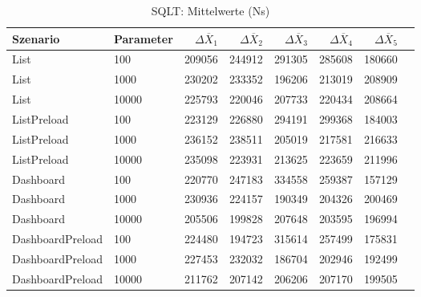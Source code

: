 
\begin{table}[ht]
\setlength{\extrarowheight}{-1pt}
\centering
\caption{SQLT: Mittelwerte (Ns)}
\begin{tabular}{llrrrrrr}
\toprule
Szenario & Parameter & ${\Delta \overline{X}_1}$ & ${\Delta \overline{X}_2}$ & ${\Delta \overline{X}_3}$ & ${\Delta \overline{X}_4}$ & ${\Delta \overline{X}_5}$ \\
\midrule
	List & 100 & 209056 & 244912 & 291305 & 285608 & 180660 \\
	List & 1000 & 230202 & 233352 & 196206 & 213019 & 208909 \\
	List & 10000 & 225793 & 220046 & 207733 & 220434 & 208664 \\
	ListPreload & 100 & 223129 & 226880 & 294191 & 299368 & 184003 \\
	ListPreload & 1000 & 236152 & 238511 & 205019 & 217581 & 216633 \\
	ListPreload & 10000 & 235098 & 223931 & 213625 & 223659 & 211996 \\
	Dashboard & 100 & 220770 & 247183 & 334558 & 259387 & 157129 \\
	Dashboard & 1000 & 230936 & 224157 & 190349 & 204326 & 200469 \\
	Dashboard & 10000 & 205506 & 199828 & 207648 & 203595 & 196994 \\
	DashboardPreload & 100 & 224480 & 194723 & 315614 & 257499 & 175831 \\
	DashboardPreload & 1000 & 227453 & 232032 & 186704 & 202946 & 192499 \\
	DashboardPreload & 10000 & 211762 & 207142 & 206206 & 207170 & 199505 \\
\bottomrule
\end{tabular}
\label{tab:mittelwerte_sqlt_ns}
\end{table}
	